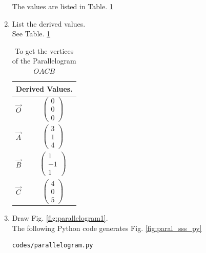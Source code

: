 \begin{enumerate}[label=\thesection.\arabic*.,ref=\thesection.\theenumi]
%
%
The values are listed in Table. \ref{table:table2} 
\item List the  derived values.
\label{const:table2}
\\
\solution See  
Table. \ref{table:table2} 
\begin{table}[ht!]
\centering
\begin{tabular}{ |p{3cm}|p{3cm}|  }
\hline
 \multicolumn{2}{|c|}{Derived Values.} \\
\hline
$\vec{O}$ & $$\begin{pmatrix}0\\0\\0\end{pmatrix} $$\\
\hline
$\vec{A}$ & $$\begin{pmatrix}3\\1\\4\end{pmatrix}$$\\						
\hline
$\vec{B}$ & $$\begin{pmatrix}1\\-1\\1\end{pmatrix} $$\\
\hline
$\vec{C}$ & $$\begin{pmatrix}4\\0\\5\end{pmatrix} $$\\
\hline
\end{tabular}
\caption{To get the vertices of the Parallelogram $OACB$}
\label{table:table2}
\end{table}
%
\item Draw Fig. \ref{fig:parallelogram1}.	
\\
\solution The  following Python code generates Fig. \ref{fig:paral_sss_py}
%
\begin{lstlisting}
codes/parallelogram.py
\end{lstlisting}


\end{enumerate}
